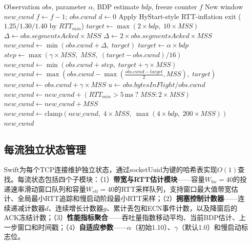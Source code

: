 \documentclass[10pt,twocolumn]{article}
\begin{document}
\begin{algorithm}[htbp]
\caption{Hybrid Rate-Window Fusion Control}
\label{alg:fusion}
\small
\begin{algorithmic}[1]
\REQUIRE Observation $obs$, parameter $\alpha$, BDP estimate $bdp$, freeze counter $f$
\ENSURE New window $new\_cwnd$
    \STATE $f \leftarrow f - 1$; \; \RETURN $obs.cwnd$ 
\ENDIF
\STATE $d \leftarrow 0$ 
    \STATE Apply HyStart-style RTT-inflation exit ($1.25/1.30/1.40$ by $RTT_{min}$)
    \STATE $target \leftarrow \max(2 \times bdp, \; 10 \times MSS)$
    \STATE $\Delta \leftarrow obs.segmentsAcked \times MSS$
        \STATE $\Delta \leftarrow 2 \times obs.segmentsAcked \times MSS$
    \ENDIF
    \STATE $new\_cwnd \leftarrow \min(obs.cwnd + \Delta, \; target)$
\ELSE
    \STATE $target \leftarrow \alpha \times bdp$
        \STATE $step \leftarrow \max(\gamma \times MSS, \; MSS, \; (target-obs.cwnd)/16)$
        \STATE $new\_cwnd \leftarrow \min(obs.cwnd + step, \; target + \gamma \times MSS)$
        \STATE $new\_cwnd \leftarrow \max(obs.cwnd - \max(\tfrac{obs.cwnd-target}{2}, MSS), \; target)$
    \ELSE
        \STATE $new\_cwnd \leftarrow obs.cwnd + \gamma \times MSS$
    \ENDIF
\ENDIF
{}
    \STATE $u \leftarrow obs.bytesInFlight / obs.cwnd$
        \STATE $new\_cwnd \leftarrow new\_cwnd + (RTT_{min} > 5\,\text{ms} \; ? \; MSS : 2 \times MSS)$
        \STATE $new\_cwnd \leftarrow new\_cwnd + MSS$
    \ENDIF
\ENDIF
\STATE $new\_cwnd \leftarrow \text{clamp}(new\_cwnd, \; 4 \times MSS, \; \max(4 \times bdp, \; 200 \times MSS))$
\RETURN $new\_cwnd$
\end{algorithmic}
\end{algorithm}

\subsection{每流独立状态管理}

Swift为每个TCP连接维护独立状态，通过socketUuid为键的哈希表实现$O(1)$查找。每流状态包括四个子模块：（1）\textbf{带宽与RTT估计模块}——容量$W_{bw}=40$的投递速率滑动窗口队列和容量$W_{rtt}=40$的RTT采样队列，支持窗口最大值带宽估计、全局最小RTT追踪和慢启动阶段最小RTT采样；（2）\textbf{拥塞控制计数器}——连续递减计数器$d$、连续增长计数器$g$、累计丢包和ECN事件计数，以及降窗后的ACK冻结计数；（3）\textbf{性能指标聚合}——吞吐量指数移动平均、当前BDP估计、上一步窗口和时间戳；（4）\textbf{自适应参数}——$\alpha$（初始1.10）、$\gamma$（默认1.0）和慢启动标志位。
\end{document}
